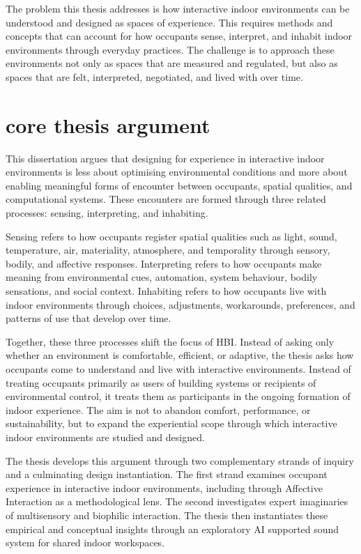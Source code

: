 The problem this thesis addresses is how interactive indoor environments can be understood and designed as spaces of experience. This requires methods and concepts that can account for how occupants sense, interpret, and inhabit indoor environments through everyday practices. The challenge is to approach these environments not only as spaces that are measured and regulated, but also as spaces that are felt, interpreted, negotiated, and lived with over time.

\section{core thesis argument}

This dissertation argues that designing for experience in interactive indoor environments is less about optimising environmental conditions and more about enabling meaningful forms of encounter between occupants, spatial qualities, and computational systems. These encounters are formed through three related processes: sensing, interpreting, and inhabiting.

Sensing refers to how occupants register spatial qualities such as light, sound, temperature, air, materiality, atmosphere, and temporality through sensory, bodily, and affective responses. Interpreting refers to how occupants make meaning from environmental cues, automation, system behaviour, bodily sensations, and social context. Inhabiting refers to how occupants live with indoor environments through choices, adjustments, workarounds, preferences, and patterns of use that develop over time.

Together, these three processes shift the focus of HBI. Instead of asking only whether an environment is comfortable, efficient, or adaptive, the thesis asks how occupants come to understand and live with interactive environments. Instead of treating occupants primarily as users of building systems or recipients of environmental control, it treats them as participants in the ongoing formation of indoor experience. The aim is not to abandon comfort, performance, or sustainability, but to expand the experiential scope through which interactive indoor environments are studied and designed.

The thesis develops this argument through two complementary strands of inquiry and a culminating design instantiation. The first strand examines occupant experience in interactive indoor environments, including through Affective Interaction as a methodological lens. The second investigates expert imaginaries of multisensory and biophilic interaction. The thesis then instantiates these empirical and conceptual insights through an exploratory AI supported sound system for shared indoor workspaces.

